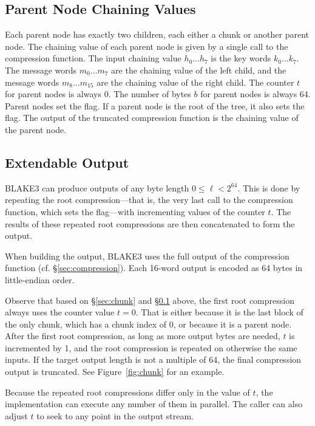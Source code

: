\documentclass[11pt,notitlepage,a4paper]{article}
\newcommand{\flag}[1]{\texttt{\detokenize{#1}}\xspace}
\begin{document}
\subsection{Parent Node Chaining Values}\label{sec:parent}

Each parent node has exactly two children, each either a chunk or another
parent node. The chaining value of each parent node is given by a single call
to the compression function. The input chaining value $h_{0} \ldots h_{7}$ is
the key words $k_{0} \ldots k_{7}$. The message words $m_{0} \ldots m_{7}$ are
the chaining value of the left child, and the message words $m_{8} \ldots
m_{15}$ are the chaining value of the right child. The counter $t$ for parent
nodes is always 0. The number of bytes $b$ for parent nodes is always 64.
Parent nodes set the \flag{PARENT} flag. If a parent node is the root of the
tree, it also sets the \flag{ROOT} flag. The output of the truncated
compression function is the chaining value of the parent node.

\subsection{Extendable Output}\label{sec:extendable}

BLAKE3 can produce outputs of any byte length $0 \leq \ell < 2^{64}$. 
This is done by repeating the root compression---that is, the very last 
call to the compression function, which sets the \flag{ROOT} flag---with 
incrementing values of the counter $t$. The results of these repeated root 
compressions are then concatenated to form the output.

When building the output, BLAKE3 uses the full output of the
compression function (cf. \S\ref{sec:compression}). Each 16-word output is
encoded as 64 bytes in little-endian order.

Observe that based on \S\ref{sec:chunk} and \S\ref{sec:parent} above, the first
root compression always uses the counter value $t = 0$. That is either because
it is the last block of the only chunk, which has a chunk index of $0$, or
because it is a parent node. After the first root compression, as long as more
output bytes are needed, $t$ is incremented by 1, and the root compression is
repeated on otherwise the same inputs. If the target output length is not a
multiple of 64, the final compression output is truncated. See
Figure~\ref{fig:chunk} for an example.

Because the repeated root compressions differ only in the value of $t$, the
implementation can execute any number of them in parallel. The caller can also
adjust $t$ to seek to any point in the output stream.
\end{document}
